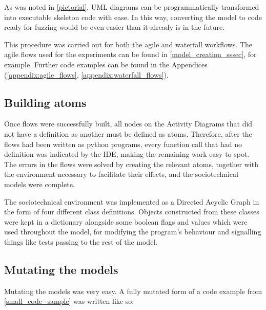 As was noted in \cref{pictorial}, UML diagrams can be programmatically transformed into executable skeleton code with ease. In this way, converting the model to code ready for fuzzing would be even easier than it already is in the future. \par

This procedure was carried out for both the agile and waterfall workflows. The agile flows used for the experiments can be found in \cref{model_creation_sssec}, for example. Further code examples can be found in the Appendices (\cref{appendix:agile_flows}, \cref{appendix:waterfall_flows}). \par

\subsection{Building atoms}
Once flows were successfully built, all nodes on the Activity Diagrams that did not have a definition as another must be defined as atoms. Therefore, after the flows had been written as python programs, every function call that had no definition was indicated by the IDE, making the remaining work easy to spot. The errors in the flows were solved by creating the relevant atoms, together with the environment necessary to facilitate their effects, and the sociotechnical models were complete. \par

The sociotechnical environment was implemented as a Directed Acyclic Graph in the form of four different class definitions. Objects constructed from these classes were kept in a dictionary alongside some boolean flags and values which were used throughout the model, for modifying the program's behaviour and signalling things like tests passing to the rest of the model. \par

\subsection{Mutating the models}
Mutating the models was very easy. A fully mutated form of a code example from \cref{small_code_sample} was written like so:

